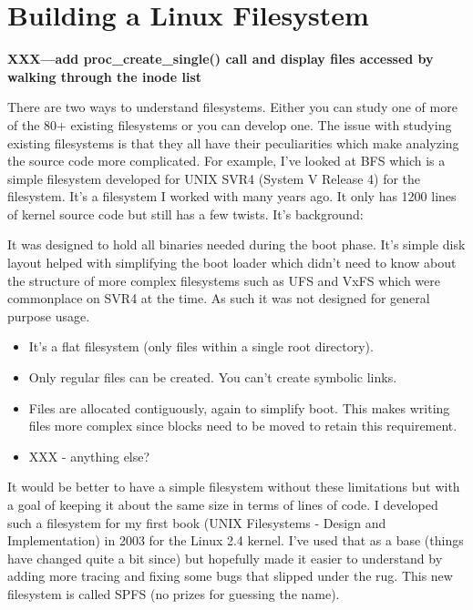 \chapter{Building a Linux Filesystem}\label{disk-fs}

\textbf{XXX---add proc\_create\_single() call and display files accessed by walking through the inode list}

There are two ways to understand filesystems. Either you can study one of more of the 80+ existing filesystems or you can develop one. The issue with studying existing filesystems is that they all have their peculiarities which 
make analyzing the source code more complicated. For example, I’ve looked at BFS which is a simple filesystem developed for UNIX SVR4 (System V Release 4) for the  filesystem. It’s a filesystem I worked with many years ago. It only has 1200 lines of kernel source code but still has a few twists. It’s background:

It was designed to hold all binaries needed during the boot phase. It’s simple disk layout helped with simplifying the boot loader which didn’t need to know about the structure of more complex filesystems such as UFS and VxFS which were commonplace on SVR4 at the time. As such it was not designed for general purpose usage.

\begin{itemize}
	\item It’s a flat filesystem (only files within a single root directory). 
	\item Only regular files can be created. You can't create symbolic links.
	\item Files are allocated contiguously, again to simplify boot. This makes writing files more complex 
		since blocks need to be moved to retain this requirement.
	\item XXX - anything else?
\end{itemize}

\noindent
It would be better to have a simple filesystem without these limitations but with a goal of keeping it about the same size in terms of lines of code. I developed such a filesystem for my first book (UNIX Filesystems - Design and 
Implementation) in 2003 for the Linux 2.4 kernel. I’ve used that as a base (things have changed quite a bit since) but hopefully made it easier to understand by adding more tracing and fixing some bugs that slipped under the 
rug. This new filesystem is called SPFS (no prizes for guessing the name).

